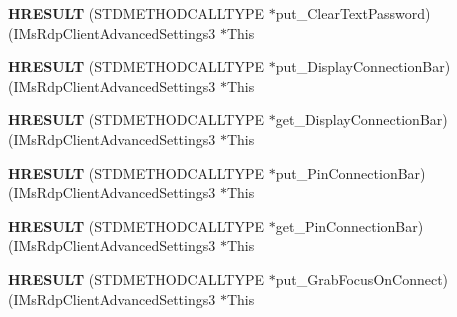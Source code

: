 \begin{DoxyCompactItemize}
\item 
\mbox{\label{struct_i_ms_rdp_client_advanced_settings3_vtbl_a120da5ca36100d43fd032ba575a26c01}} 
{\bfseries H\+R\+E\+S\+U\+LT} (S\+T\+D\+M\+E\+T\+H\+O\+D\+C\+A\+L\+L\+T\+Y\+PE $\ast$put\+\_\+\+Clear\+Text\+Password)(I\+Ms\+Rdp\+Client\+Advanced\+Settings3 $\ast$This
\item 
\mbox{\label{struct_i_ms_rdp_client_advanced_settings3_vtbl_a58238dc3454ed50e2371af0519c791ab}} 
{\bfseries H\+R\+E\+S\+U\+LT} (S\+T\+D\+M\+E\+T\+H\+O\+D\+C\+A\+L\+L\+T\+Y\+PE $\ast$put\+\_\+\+Display\+Connection\+Bar)(I\+Ms\+Rdp\+Client\+Advanced\+Settings3 $\ast$This
\item 
\mbox{\label{struct_i_ms_rdp_client_advanced_settings3_vtbl_a2c0831991aafc0290b02b0a834a4886c}} 
{\bfseries H\+R\+E\+S\+U\+LT} (S\+T\+D\+M\+E\+T\+H\+O\+D\+C\+A\+L\+L\+T\+Y\+PE $\ast$get\+\_\+\+Display\+Connection\+Bar)(I\+Ms\+Rdp\+Client\+Advanced\+Settings3 $\ast$This
\item 
\mbox{\label{struct_i_ms_rdp_client_advanced_settings3_vtbl_ad6e7610ce6393d773532dd99afcf071b}} 
{\bfseries H\+R\+E\+S\+U\+LT} (S\+T\+D\+M\+E\+T\+H\+O\+D\+C\+A\+L\+L\+T\+Y\+PE $\ast$put\+\_\+\+Pin\+Connection\+Bar)(I\+Ms\+Rdp\+Client\+Advanced\+Settings3 $\ast$This
\item 
\mbox{\label{struct_i_ms_rdp_client_advanced_settings3_vtbl_ad03770cf4b5f5e0b9c43ab8ca924eb63}} 
{\bfseries H\+R\+E\+S\+U\+LT} (S\+T\+D\+M\+E\+T\+H\+O\+D\+C\+A\+L\+L\+T\+Y\+PE $\ast$get\+\_\+\+Pin\+Connection\+Bar)(I\+Ms\+Rdp\+Client\+Advanced\+Settings3 $\ast$This
\item 
\mbox{\label{struct_i_ms_rdp_client_advanced_settings3_vtbl_aeca9b6893d2cbebf02e3e1a84ea523c4}} 
{\bfseries H\+R\+E\+S\+U\+LT} (S\+T\+D\+M\+E\+T\+H\+O\+D\+C\+A\+L\+L\+T\+Y\+PE $\ast$put\+\_\+\+Grab\+Focus\+On\+Connect)(I\+Ms\+Rdp\+Client\+Advanced\+Settings3 $\ast$This
\item 
\mbox{\label{struct_i_ms_rdp_client_advanced_settings3_vtbl_a20e2fd1c632a48036a5175acb0937412}} 

\end{DoxyCompactItemize}
